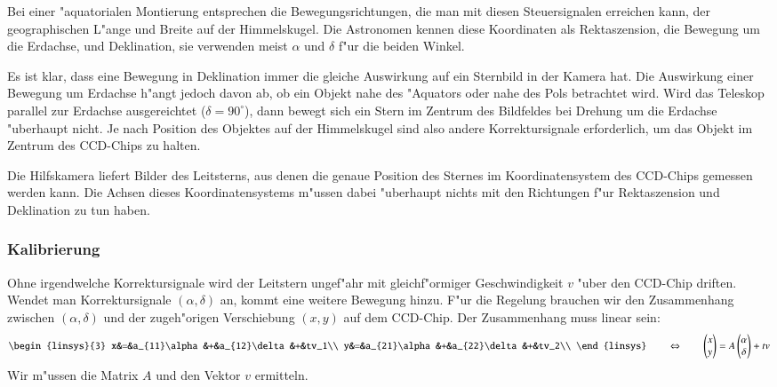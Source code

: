 Bei einer "aquatorialen Montierung entsprechen die Bewegungsrichtungen,
die man mit diesen Steuersignalen erreichen kann, der geographischen
L"ange und Breite auf der Himmelskugel. Die Astronomen kennen diese
Koordinaten als Rektaszension, die Bewegung um die Erdachse, und Deklination,
sie verwenden meist $\alpha$ und $\delta$ f"ur die beiden Winkel.

Es ist klar, dass eine Bewegung in Deklination immer die gleiche Auswirkung
auf ein Sternbild in der Kamera hat.
Die Auswirkung einer Bewegung um Erdachse h"angt jedoch
davon ab, ob ein Objekt nahe des "Aquators oder nahe des Pols
betrachtet wird. Wird das Teleskop parallel zur Erdachse ausgereichtet
($\delta=90^\circ$), dann bewegt sich ein Stern im Zentrum des Bildfeldes
bei Drehung um die Erdachse "uberhaupt nicht.
Je nach Position des Objektes auf der Himmelskugel sind also andere
Korrektursignale erforderlich, um das Objekt im Zentrum des CCD-Chips
zu halten.

Die Hilfskamera liefert Bilder des Leitsterns, aus denen die genaue
Position des Sternes im Koordinatensystem des CCD-Chips gemessen
werden kann. Die Achsen dieses Koordinatensystems m"ussen dabei
"uberhaupt nichts mit den Richtungen f"ur Rektaszension und Deklination
zu tun haben.

\subsubsection{Kalibrierung}
Ohne irgendwelche Korrektursignale wird der Leitstern ungef"ahr mit
gleichf"ormiger Geschwindigkeit $v$ "uber den CCD-Chip driften.
Wendet man Korrektursignale $(\alpha,\delta)$ an, kommt eine
weitere Bewegung hinzu. F"ur die Regelung brauchen wir den Zusammenhang
zwischen $(\alpha,\delta)$ und der zugeh"origen Verschiebung $(x,y)$ auf dem
CCD-Chip. Der Zusammenhang muss linear sein:
\begin{equation}
\begin{linsys}{3}
x&=&a_{11}\alpha&+&a_{12}\delta&+&tv_1\\
y&=&a_{21}\alpha&+&a_{22}\delta&+&tv_2\\
\end{linsys}
\qquad
\Leftrightarrow
\qquad
\begin{pmatrix}x\\y\end{pmatrix}
=A\begin{pmatrix}\alpha\\\delta\end{pmatrix}+tv
\label{guiding:model}
\end{equation}
Wir m"ussen die Matrix $A$ und den Vektor $v$ ermitteln.

